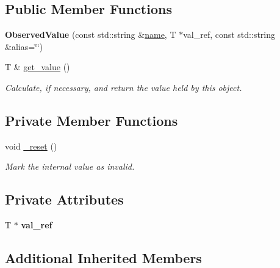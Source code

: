 \subsection*{Public Member Functions}
\begin{DoxyCompactItemize}
\item 
\hypertarget{classfv_1_1ObservedValue_a4530da20550883f9e956403cb1cfced4}{}\label{classfv_1_1ObservedValue_a4530da20550883f9e956403cb1cfced4} 
{\bfseries Observed\+Value} (const std\+::string \&\hyperlink{classfv_1_1GenValue_a610f89ee441eaad4c9e78f74d6bde93b}{name}, T $\ast$val\+\_\+ref, const std\+::string \&alias=\char`\"{}\char`\"{})
\item 
\hypertarget{classfv_1_1ObservedValue_a10419313294471ba9da25e55d23956ba}{}\label{classfv_1_1ObservedValue_a10419313294471ba9da25e55d23956ba} 
T \& \hyperlink{classfv_1_1ObservedValue_a10419313294471ba9da25e55d23956ba}{get\+\_\+value} ()
\begin{DoxyCompactList}\small\item\em Calculate, if necessary, and return the value held by this object. \end{DoxyCompactList}\end{DoxyCompactItemize}
\subsection*{Private Member Functions}
\begin{DoxyCompactItemize}
\item 
void \hyperlink{classfv_1_1ObservedValue_af301f95c27cfa8024105a845ac6a7760}{\+\_\+reset} ()
\begin{DoxyCompactList}\small\item\em Mark the internal value as invalid. \end{DoxyCompactList}\end{DoxyCompactItemize}
\subsection*{Private Attributes}
\begin{DoxyCompactItemize}
\item 
\hypertarget{classfv_1_1ObservedValue_a18aeb656fc14e2161c7b7710ab944829}{}\label{classfv_1_1ObservedValue_a18aeb656fc14e2161c7b7710ab944829} 
T $\ast$ {\bfseries val\+\_\+ref}
\end{DoxyCompactItemize}
\subsection*{Additional Inherited Members}


